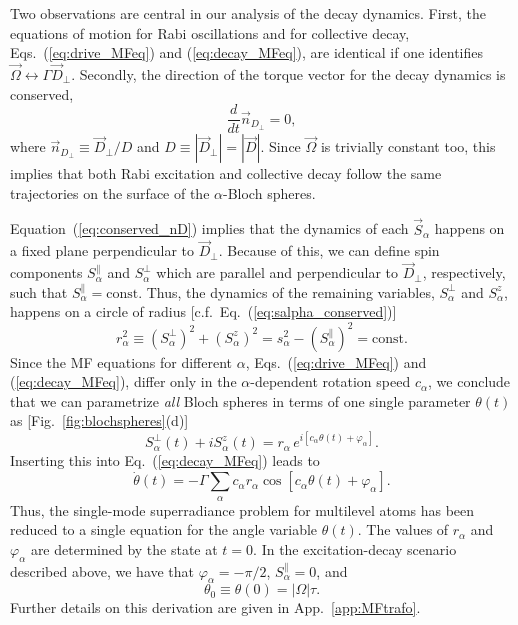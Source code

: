 \documentclass[aps,prx,superscriptaddress,twocolumn,notitlepage,nofootinbib,longbibliography]{revtex4-2}
\begin{document}
Two observations are central in our analysis of the decay dynamics. First, the equations of motion for Rabi oscillations and for collective decay, Eqs.~(\ref{eq:drive_MFeq}) and (\ref{eq:decay_MFeq}), are identical if one identifies $\vec{\Omega}\leftrightarrow \Gamma \vec{D}_\perp$.
Secondly, the direction of the torque vector for the decay dynamics is conserved,
\begin{equation}
	\frac{d}{dt} \vec{n}_{D_\perp} = 0,
\label{eq:conserved_nD}
\end{equation}
where $\vec{n}_{D_\perp} \equiv \vec{D}_\perp/D$ and $D\equiv |\vec{D}_\perp| = |\vec{D}|$.
Since $\vec{\Omega}$ is trivially constant too, this implies that both Rabi excitation and collective decay follow the same trajectories on the surface of the $\alpha$-Bloch spheres.

Equation~(\ref{eq:conserved_nD}) implies that the dynamics of each $\vec{S}_\alpha$ happens on a fixed plane perpendicular to $\vec{D}_\perp$.
Because of this, we can define spin components $S^\parallel_\alpha $ and $S^\perp_\alpha$ which are parallel and perpendicular to $\vec{D}_\perp$, respectively, such that $S^\parallel_\alpha=\text{const}$.
Thus, the dynamics of the remaining variables, $S^\perp_\alpha$ and $S^z_\alpha$, happens on a circle of radius [c.f.~Eq.~(\ref{eq:salpha_conserved})]
\begin{equation}
	r_\alpha^2 \equiv (S^\perp_\alpha)^2+(S^z_\alpha)^2 = s_\alpha^2 - (S^\parallel_\alpha)^2 = \text{const}.
\label{eq:ralpha_conserved}
\end{equation}
Since the MF equations for different $\alpha$, Eqs.~(\ref{eq:drive_MFeq}) and (\ref{eq:decay_MFeq}), differ only in the $\alpha$-dependent rotation speed $c_\alpha$, we conclude that we can parametrize \emph{all} Bloch spheres in terms of one single parameter $\theta(t)$ as [Fig.~\ref{fig:blochspheres}(d)]
\begin{equation}
	S^\perp_\alpha(t) + i S^z_\alpha(t) = r_\alpha\, e^{i[ c_\alpha \theta(t) + \varphi_\alpha ]}.
\label{eq:ansatz_SperpSz}
\end{equation}
Inserting this into Eq.~(\ref{eq:decay_MFeq}) leads to
\begin{equation}
	\dot\theta(t) = -\Gamma \sum_\alpha c_\alpha r_\alpha \cos\left[ c_\alpha \theta(t) + \varphi_\alpha \right].
\label{eq:theta_eq}
\end{equation}
Thus, the single-mode superradiance problem for multilevel atoms has been reduced to a single equation for the angle variable $\theta(t)$.
The values of $r_\alpha$ and $\varphi_\alpha$ are determined by the state at $t=0$.
In the excitation-decay scenario described above, we have that $\varphi_\alpha=-\pi/2$, $S^\parallel_\alpha=0$, and
\begin{equation}
	\theta_0\equiv\theta(0) = |\Omega|\tau .
\label{eq:theta0_V}
\end{equation}
Further details on this derivation are given in App.~\ref{app:MFtrafo}.
\end{document}
